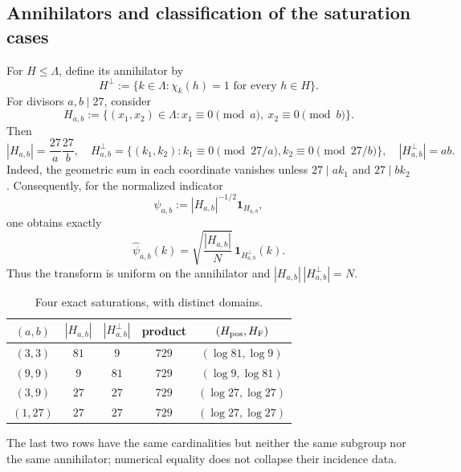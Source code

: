 \subsection{Annihilators and classification of the saturation cases}
\label{v:n19:sec:anuladores}

For \(H\le\Lambda\), define its annihilator by
\begin{equation}
 H^\perp:=\{k\in\Lambda:\chi_k(h)=1\text{ for every }h\in H\}.
 \label{v:n19:eq:anulador}
\end{equation}
For divisors \(a,b\mid27\), consider
\begin{equation}
 H_{a,b}:=\{(x_1,x_2)\in\Lambda:
 x_1\equiv0\pmod a,\ x_2\equiv0\pmod b\}.
 \label{v:n19:eq:subgrupo-rectangular}
\end{equation}
Then
\begin{equation}
 |H_{a,b}|=\frac{27}{a}\frac{27}{b},
 \quad
 H_{a,b}^{\perp}
 =\{(k_1,k_2):k_1\equiv0\pmod{27/a},
                  k_2\equiv0\pmod{27/b}\},
 \quad |H_{a,b}^{\perp}|=ab.
 \label{v:n19:eq:anulador-explicito}
\end{equation}
Indeed, the geometric sum in each coordinate vanishes unless
\(27\mid ak_1\) and \(27\mid bk_2\). Consequently, for the normalized
indicator
\begin{equation}
 \psi_{a,b}:=|H_{a,b}|^{-1/2}\mathbf1_{H_{a,b}},
 \label{v:n19:eq:indicador-normalizado}
\end{equation}
one obtains exactly
\begin{equation}
 \widehat\psi_{a,b}(k)
 =\sqrt{\frac{|H_{a,b}|}{N}}\,
   \mathbf1_{H_{a,b}^{\perp}}(k).
 \label{v:n19:eq:fourier-indicador}
\end{equation}
Thus the transform is uniform on the annihilator and
\(|H_{a,b}|\,|H_{a,b}^{\perp}|=N\).

\begin{table}[htbp]
\centering
\caption{Four exact saturations, with distinct domains.}
\label{v:n19:tab:saturaciones}
\begin{tabular}{@{}ccccc@{}}
\toprule
\((a,b)\) & \(|H_{a,b}|\) & \(|H_{a,b}^{\perp}|\) & product
 & \((H_{\rm pos},H_{\rm F})\) \\
\midrule
\((3,3)\)  & \(81\) & \(9\)  & \(729\) & \((\log81,\log9)\) \\
\((9,9)\)  & \(9\)  & \(81\) & \(729\) & \((\log9,\log81)\) \\
\((3,9)\)  & \(27\) & \(27\) & \(729\) & \((\log27,\log27)\) \\
\((1,27)\) & \(27\) & \(27\) & \(729\) & \((\log27,\log27)\) \\
\bottomrule
\end{tabular}
\end{table}
The last two rows have the same cardinalities but neither the same subgroup
nor the same annihilator; numerical equality does not collapse their
incidence data.

